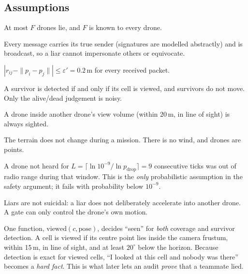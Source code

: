 \subsection{Assumptions}
\label{sec:assumptions}

\begin{assumption} At most $F$ drones lie, and $F$ is known to every drone. \end{assumption}
\begin{assumption} Every message carries its true sender (signatures are modelled abstractly)
and is broadcast, so a liar cannot impersonate others or equivocate. \end{assumption}
\begin{assumption} $|r_{ij}-\|p_i-p_j\||\le\varepsilon' = 0.2$\,m for every received packet. \end{assumption}
\begin{assumption} A survivor is detected if and only if its cell is viewed, and survivors do
not move. Only the alive/dead judgement is noisy. \end{assumption}
\begin{assumption} A drone inside another drone's view volume (within 20\,m, in line of sight) is
always sighted. \end{assumption}
\begin{assumption} The terrain does not change during a mission. There is no wind, and drones are points. \end{assumption}
\begin{assumption}[Silence] A drone not heard for $L=\lceil \ln 10^{-9}/\ln p_{\mathrm{drop}}\rceil=9$ consecutive
ticks was out of radio range during that window. This is the \emph{only} probabilistic assumption in the safety
argument; it fails with probability below $10^{-9}$. \end{assumption}
\begin{assumption}[No ramming] Liars are not suicidal: a liar does not deliberately accelerate into another drone. A
gate can only control the drone's own motion. \end{assumption}

\begin{keybox}
One function, $\mathrm{viewed}(c,\text{pose})$, decides ``seen'' for \emph{both} coverage and survivor detection. A cell
is viewed if its centre point lies inside the camera frustum, within 15\,m, in line of sight, and at least $20^\circ$
below the horizon. Because detection is exact for viewed cells, ``I looked at this cell and nobody was there'' becomes a
\emph{hard fact}. This is what later lets an audit \emph{prove} that a teammate lied.
\end{keybox}

